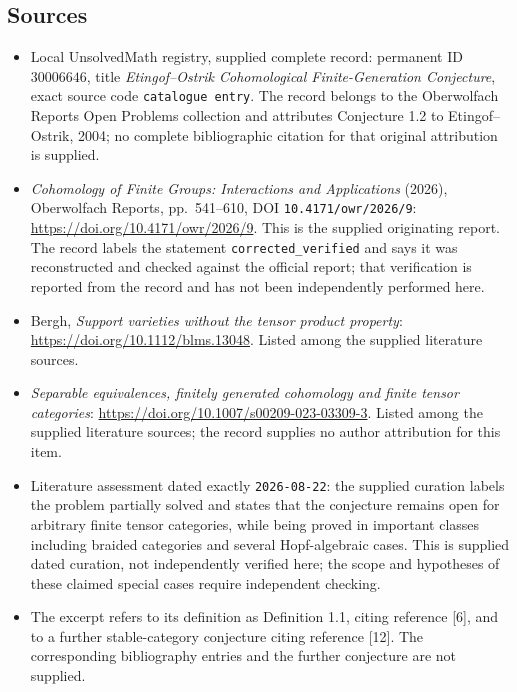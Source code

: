 \documentclass[11pt]{article}
\begin{document}
\subsection{Sources}
\begin{itemize}
\item Local UnsolvedMath registry, supplied complete record: permanent ID \(30006646\), title \emph{Etingof--Ostrik Cohomological Finite-Generation Conjecture}, exact source code \texttt{catalogue entry}. The record belongs to the Oberwolfach Reports Open Problems collection and attributes Conjecture 1.2 to Etingof--Ostrik, 2004; no complete bibliographic citation for that original attribution is supplied.
\item \emph{Cohomology of Finite Groups: Interactions and Applications} (2026), Oberwolfach Reports, pp.\ 541--610, DOI \texttt{10.4171/owr/2026/9}: \url{https://doi.org/10.4171/owr/2026/9}. This is the supplied originating report. The record labels the statement \texttt{corrected\_verified} and says it was reconstructed and checked against the official report; that verification is reported from the record and has not been independently performed here.
\item Bergh, \emph{Support varieties without the tensor product property}: \url{https://doi.org/10.1112/blms.13048}. Listed among the supplied literature sources.
\item \emph{Separable equivalences, finitely generated cohomology and finite tensor categories}: \url{https://doi.org/10.1007/s00209-023-03309-3}. Listed among the supplied literature sources; the record supplies no author attribution for this item.
\item Literature assessment dated exactly \texttt{2026-08-22}: the supplied curation labels the problem partially solved and states that the conjecture remains open for arbitrary finite tensor categories, while being proved in important classes including braided categories and several Hopf-algebraic cases. This is supplied dated curation, not independently verified here; the scope and hypotheses of these claimed special cases require independent checking.
\item The excerpt refers to its definition as Definition 1.1, citing reference [6], and to a further stable-category conjecture citing reference [12]. The corresponding bibliography entries and the further conjecture are not supplied.
\end{itemize}
\end{document}
